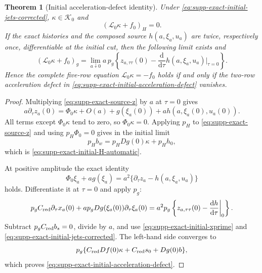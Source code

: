\documentclass[11pt]{article}
\newtheorem{theorem}{Theorem}[section]
\numberwithin{equation}{section}
\theoremstyle{definition}
\theoremstyle{remark}
\newcommand{\dd}{\mathrm d}
\begin{document}
\begin{theorem}[Initial acceleration-defect identity]
\label{thm:supp-exact-initial-gate}
Under \eqref{eq:supp-exact-initial-jets-corrected},
$\kappa\in\mathcal K_0$ and
\begin{equation}
 (\mathcal L_0\kappa+f_0)_H=0.
 \label{eq:supp-exact-initial-H-automatic}
\end{equation}
If the exact histories and the composed source $h(a,\xi_a,u_a)$ are twice,
respectively once, differentiable at the initial cut, then the following
limit exists and
\begin{equation}
 (\mathcal L_0\kappa+f_0)_g
 =\lim_{a\downarrow0}a\,p_g
 \left\{z_{a,\tau\tau}(0)-
 \frac{\dd}{\dd\tau}h(a,\xi_a,u_a)\bigg|_{\tau=0}\right\}.
 \label{eq:supp-exact-initial-acceleration-defect}
\end{equation}
Hence the complete five-row equation
$\mathcal L_0\kappa=-f_0$ holds if and only if the two-row acceleration
defect in \eqref{eq:supp-exact-initial-acceleration-defect} vanishes.
\end{theorem}

\begin{proof}
Multiplying \eqref{eq:supp-exact-source-z} by $a$ at $\tau=0$ gives
\[
 a\partial_\tau z_a(0)
 =\Phi_0\kappa+O(a)+g(\xi_a(0))+a h(a,\xi_a(0),u_a(0)).
\]
All terms except $\Phi_0\kappa$ tend to zero, so
$\Phi_0\kappa=0$.  Applying $p_H$ to
\eqref{eq:supp-exact-source-z} and using $p_H\Phi_0=0$ gives in the
initial limit
\[
 p_Hb_w=p_HDg(0)\kappa+p_Hh_0,
\]
which is \eqref{eq:supp-exact-initial-H-automatic}.

At positive amplitude the exact identity
\begin{equation}
 \Phi_0\xi_a+a g(\xi_a)
 =a^2\{\partial_\tau z_a-h(a,\xi_a,u_a)\}
 \label{eq:supp-exact-initial-pole-identity}
\end{equation}
holds.  Differentiate it at $\tau=0$ and apply $p_g$:
\begin{equation}
 p_gC_{\rm red}\partial_\tau x_a(0)
 +a p_gDg(\xi_a(0))\partial_\tau\xi_a(0)
 =a^2p_g\left\{z_{a,\tau\tau}(0)-
        \frac{\dd h}{\dd\tau}\bigg|_0\right\}.
 \label{eq:supp-exact-initial-differentiated-pole}
\end{equation}
Subtract $p_gC_{\rm red}b_s=0$, divide by $a$, and use
\eqref{eq:supp-exact-initial-xprime} and
\eqref{eq:supp-exact-initial-jets-corrected}.  The left-hand side converges
to
\[
 p_g\{C_{\rm red}Df(0)\kappa+C_{\rm red}s_0+Dg(0)b\},
\]
which proves \eqref{eq:supp-exact-initial-acceleration-defect}.
\end{proof}
\end{document}
